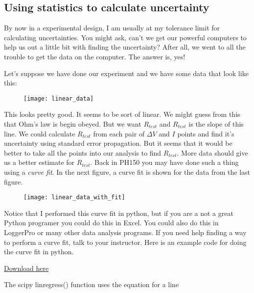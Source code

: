 \subsection{Using statistics to calculate uncertainty}

By now in a experimental design, I am usually at my tolerance limit for calculating uncertainties. You might ask, can't we get our powerful computers to help us out a little bit with finding the uncertainty? After all, we went to all the trouble to get the data on the computer. The answer is, yes!

Let's suppose we have done our experiment and we have some data that look like this: 

\begin{figure}[h!]
	\centering
	\texttt{[image: linear\_data]}
\end{figure}

This looks pretty good. It seems to be sort of linear. We might guess from this that Ohm's law is begin obeyed. But we want $R_{test}$ and $R_{test}$ is the slope of this line. We could calculate $R_{test}$ from each pair of $\Delta V$ and $I$ points and find it's uncertainty using standard error propagation. But it seems that it would be better to take all the points into our analysis to find $R_{test}.$ More data should give us a better estimate for $R_{test}.$ Back in PH150 you may have done such a thing using a \emph{curve fit}. In the next figure, a curve fit is shown for the data from the last figure. 

\begin{figure}[h!]
	\centering
	\texttt{[image: linear\_data\_with\_fit]}
\end{figure}

Notice that I performed this curve fit in python, but if you are a not a great Python programer you could do this in Excel. You could also do this in LoggerPro or many other data analysis programs. If you need help finding a way to perform a curve fit, talk to your instructor. Here is an example code for doing the curve fit in python.

\vspace{0.24in}
\href{https://raw.githubusercontent.com/rtlines/IntermediateLabPH250/main/Code/linear_fit.py}{Download here}



The scipy linregress() function uses the equation for a line 

